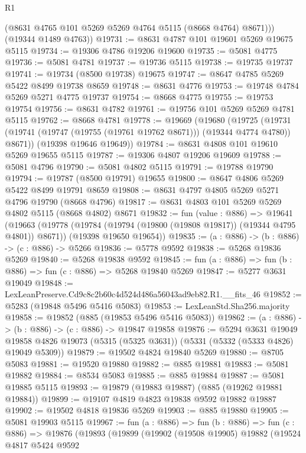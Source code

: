 \begin{lexlean}{R1}
\begin{coremodule}
          (@8631 @4765 @101 @5269 @5269 @4764 @5115 (@8668 @4764) @8671)))
      (@19344 @1489 @4763))
@19731 := @8631 @4787 @101 @19601 @5269 @19675 @5115
@19734 := @19306 @4786 @19206 @19600
@19735 := @5081 @4775
@19736 := @5081 @4781
@19737 := @19736 @5115
@19738 := @19735 @19737
@19741 := @19734 (@8500 @19738) @19675
@19747 := @8647 @4785 @5269 @5422 @8499 @19738 @8659
@19748 := @8631 @4776
@19753 := @19748 @4784 @5269 @5271 @4775 @19737
@19754 := @8668 @4775
@19755 := @19753 @19754
@19756 := @8631 @4782
@19761 := @19756 @101 @5269 @5269 @4781 @5115
@19762 := @8668 @4781
@19778 := @19669
    (@19680
      (@19725 (@19731 (@19741 (@19747 (@19755 (@19761 @19762 @8671))) (@19344 @4774 @4780)) @8671))
      (@19398 @19646 @19649))
@19784 := @8631 @4808 @101 @19610 @5269 @19655 @5115
@19787 := @19306 @4807 @19206 @19609
@19788 := @5081 @4796
@19790 := @5081 @4802 @5115
@19791 := @19788 @19790
@19794 := @19787 (@8500 @19791) @19655
@19800 := @8647 @4806 @5269 @5422 @8499 @19791 @8659
@19808 := @8631 @4797 @4805 @5269 @5271 @4796 @19790 (@8668 @4796)
@19817 := @8631 @4803 @101 @5269 @5269 @4802 @5115 (@8668 @4802) @8671
@19832 := fun (value : @886) =>
  @19641
    (@19663
      (@19778 (@19784 (@19794 (@19800 (@19808 @19817)) (@19344 @4795 @4801)) @8671))
      (@19398 @19650 @19654))
@19835 := (a : @886) -> (b : @886) -> (c : @886) -> @5266
@19836 := @5778 @9592
@19838 := @5268 @19836 @5269
@19840 := @5268 @19838 @9592
@19845 := fun (a : @886) => fun (b : @886) => fun (c : @886) => @5268 @19840 @5269
@19847 := @5277 @3631 @19049
@19848 := LexLeanPreserve.Cd9c8c2b60c4d524d486a56043ad9eb82.R1.__fits_46
@19852 := @5283 (@19848 @5496 @5416 @5083)
@19853 := LexLeanStd.Sha256.majority
@19858 := @19852 (@885 (@19853 @5496 @5416 @5083))
@19862 := (a : @886) -> (b : @886) -> (c : @886) -> @19847 @19858
@19876 := @5294
    @3631
    @19049
    @19858
    @4826
    @19073
    (@5315 (@5325 @3631))
    (@5331 (@5332 (@5333 @4826) @19049 @5309))
@19879 := @19502 @4824 @19840 @5269
@19880 := @8705 @5083
@19881 := @19520 @19880
@19882 := @885 @19881
@19883 := @5081 @19882
@19884 := @8534 @5083
@19885 := @885 @19884
@19887 := @5081 @19885 @5115
@19893 := @19879 (@19883 @19887) (@885 (@19262 @19881 @19884))
@19899 := @19107 @4819 @4823 @19838 @9592 @19882 @19887
@19902 := @19502 @4818 @19836 @5269
@19903 := @885 @19880
@19905 := @5081 @19903 @5115
@19967 := fun (a : @886) =>
  fun (b : @886) =>
  fun (c : @886) =>
  @19876
    (@19893
      (@19899
        (@19902
          (@19508 @19905)
          @19882
          (@19524
            @4817
            @5424
            @9592

\end{coremodule}
\end{lexlean}
